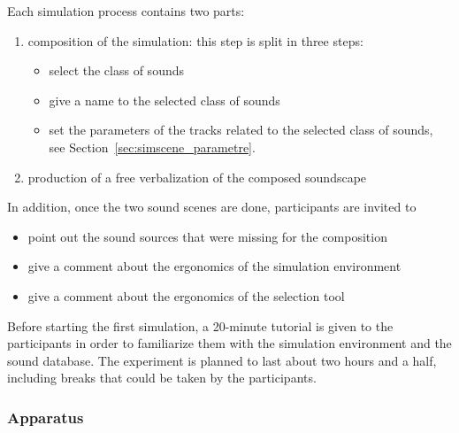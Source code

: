 \documentclass[preprint,12pt]{elsarticle}
\begin{document}
Each simulation process contains two parts:
\begin{enumerate}
\item composition of the simulation: this step is split in three steps:
\begin{itemize}
  \item  select the class of sounds
	\item  give a name to the selected class of sounds
	\item  set the parameters of the tracks related to the selected class of sounds, see Section~\ref{sec:simscene_parametre}.
\end{itemize}
\item production of a free verbalization of the composed soundscape
\end{enumerate}

In addition, once the two sound scenes are done, participants are invited to
\begin{itemize}
\item  point out the sound sources that were missing for the composition
\item  give a comment about the ergonomics of the simulation environment
\item   give a comment about the ergonomics of the selection tool
\end{itemize}

Before starting the first simulation, a 20-minute tutorial is given to the participants in order to familiarize them with the simulation environment and the sound database. The experiment is planned to last about two hours and a half, including breaks that could be taken by the participants.

\subsubsection*{Apparatus}

%
%
\end{document}
